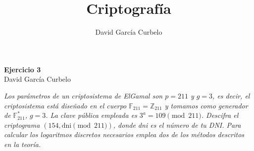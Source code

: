 \documentclass[fleqn]{article}
\author{David García Curbelo}
\title{Criptografía}
\def\Z{\mathds{Z}}
\def\F{\mathds{F}}
\begin{document}
    \begin{center}
        \LARGE{\textbf{Ejercicio 3}} \\
        \Large{David García Curbelo} 
    \end{center}

    \vspace{1cm}     

    \textit{Los parámetros de un criptosistema de ElGamal son $p = 211$ y 
    $g = 3$, es decir, el criptosistema está diseñado en el cuerpo $\F_{211} = \Z_{211}$ y tomamos
    como generador de $\F_{211}^*$, $g = 3$. La clave pública empleada es $3^a = 109 \pmod{211}$.
    Descifra el criptograma $(154, \text{dni} \pmod{211})$, donde dni es el número de tu DNI. Para 
    calcular los logaritmos discretos necesarios emplea dos de los métodos descritos en la teoría.} 

    \vspace{0.5cm}   
\end{document}
